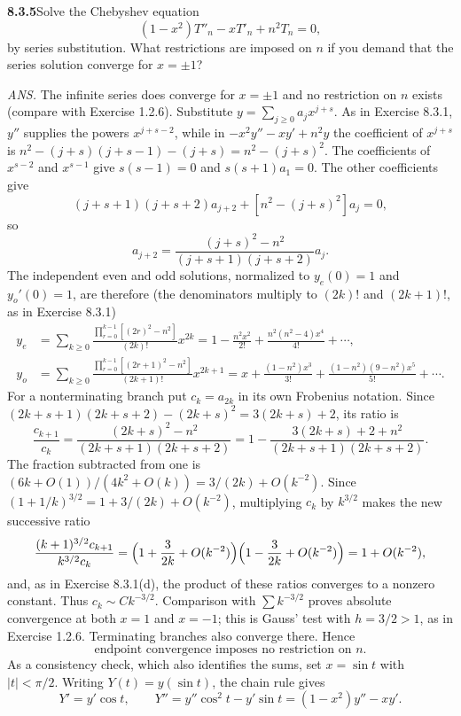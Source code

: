 \par\bigskip
\noindent\textbf{8.3.5}\quad Solve the Chebyshev equation
\[
(1-x^{2})T''_{n}-xT'_{n}+n^{2}T_{n}=0,
\]
by series substitution. What restrictions are imposed on $n$ if you demand
that the series solution converge for $x=\pm1$?
\par\nobreak\hfill\emph{ANS.}\enspace
The infinite series does converge for $x=\pm1$ and no restriction on $n$
exists (compare with Exercise 1.2.6).
\solution
Substitute $y=\sum_{j\ge0}a_jx^{j+s}$.  As in Exercise 8.3.1, $y''$
supplies the powers $x^{j+s-2}$, while in $-x^2y''-xy'+n^2y$ the
coefficient of $x^{j+s}$ is $n^2-(j+s)(j+s-1)-(j+s)=n^2-(j+s)^2$.
The coefficients of
$x^{s-2}$ and $x^{s-1}$ give $s(s-1)=0$ and $s(s+1)a_1=0$.
The other coefficients give
\[
(j+s+1)(j+s+2)a_{j+2}+[n^2-(j+s)^2]a_j=0,
\]
so
\[
\boxed{a_{j+2}=\frac{(j+s)^2-n^2}{(j+s+1)(j+s+2)}a_j}.
\]
The independent even and odd solutions, normalized to $y_e(0)=1$
and $y_o'(0)=1$, are therefore (the denominators multiply to $(2k)!$
and $(2k+1)!$, as in Exercise 8.3.1)
\begin{align*}
y_e&=\sum_{k\ge0}
\frac{\prod_{r=0}^{k-1}[(2r)^2-n^2]}{(2k)!}x^{2k}
=1-\frac{n^2x^2}{2!}+\frac{n^2(n^2-4)x^4}{4!}+\cdots,\\
y_o&=\sum_{k\ge0}
\frac{\prod_{r=0}^{k-1}[(2r+1)^2-n^2]}{(2k+1)!}x^{2k+1}
=x+\frac{(1-n^2)x^3}{3!}
 +\frac{(1-n^2)(9-n^2)x^5}{5!}+\cdots.
\end{align*}
For a nonterminating branch put $c_k=a_{2k}$ in its own Frobenius
notation.  Since $(2k+s+1)(2k+s+2)-(2k+s)^2=3(2k+s)+2$, its ratio is
\[
\frac{c_{k+1}}{c_k}
=\frac{(2k+s)^2-n^2}{(2k+s+1)(2k+s+2)}
=1-\frac{3(2k+s)+2+n^2}{(2k+s+1)(2k+s+2)}.
\]
The fraction subtracted from one is
$(6k+O(1))/(4k^2+O(k))=3/(2k)+O(k^{-2})$.
Since $(1+1/k)^{3/2}=1+3/(2k)+O(k^{-2})$, multiplying $c_k$ by
$k^{3/2}$ makes the new successive ratio
\[
\frac{(k+1)^{3/2}c_{k+1}}{k^{3/2}c_k}
=\Bigl(1+\frac{3}{2k}+O(k^{-2})\Bigr)
 \Bigl(1-\frac{3}{2k}+O(k^{-2})\Bigr)=1+O(k^{-2}),
\]
and, as in Exercise 8.3.1(d), the product of these ratios converges
to a nonzero constant.
Thus $c_k\sim Ck^{-3/2}$.  Comparison with $\sum k^{-3/2}$ proves
absolute convergence at both $x=1$ and $x=-1$; this is Gauss' test
with $h=3/2>1$, as in Exercise 1.2.6.
Terminating branches also converge there.  Hence
\[
\boxed{\text{endpoint convergence imposes no restriction on }n.}
\]
As a consistency check, which also identifies the sums, set
$x=\sin t$ with $|t|<\pi/2$.
Writing $Y(t)=y(\sin t)$, the chain rule gives
\[
Y'=y'\cos t,\qquad
Y''=y''\cos^2t-y'\sin t=(1-x^2)y''-xy'.
\]
